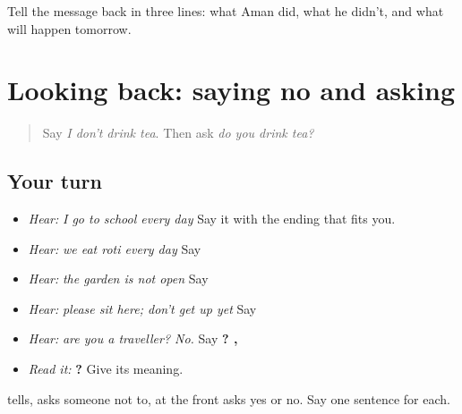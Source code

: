 \begin{tcolorbox}[breakable,colback=teal!4,colframe=teal!35!black,title={Before you move on}]
Tell the message back in three lines: what Aman did, what he didn't, and what will happen tomorrow.
\end{tcolorbox}
\section[\texorpdfstring{\pa{ਨਹੀਂ} · \pa{ਨਾ} · \pa{ਕੀ} (nahīṁ · nā · kī)}{ਨਹੀਂ · ਨਾ · ਕੀ (nahīṁ · nā · kī)}]{Looking back: saying no and asking}

\label{lesson:PA-R224-first-pass-saying-no-and-asking}



\begin{quote}
Say \emph{I don't drink tea}. Then ask \emph{do you drink tea?}
\end{quote}

\subsection*{Your turn}
\begin{itemize}
\raggedright
  \item \emph{Hear:} \emph{I go to school every day} Say it with the ending that fits you.
  \item \emph{Hear:} \emph{we eat roti every day} Say \textbf{    }
  \item \emph{Hear:} \emph{the garden is not open} Say \textbf{   }
  \item \emph{Hear:} \emph{please sit here; don't get up yet} Say \textbf{    }
  \item \emph{Hear:} \emph{are you a traveller? No.} Say \textbf{   ?  ,    }
  \item \emph{Read it:} \textbf{     ?} Give its meaning.
\end{itemize}

\begin{tcolorbox}[breakable,colback=teal!4,colframe=teal!35!black,title={Before you move on}]
\textbf{} tells, \textbf{} asks someone not to, \textbf{} at the front asks yes or no. Say one sentence for each.
\end{tcolorbox}
